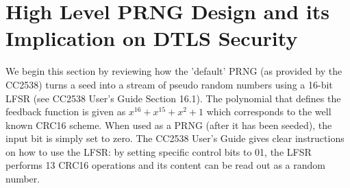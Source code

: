 \section{High Level PRNG Design and its Implication on DTLS Security} \label{LFSR}
We begin this section by reviewing how the 'default' PRNG (as provided by the CC2538) turns a seed into a stream of pseudo random numbers using a 16-bit LFSR (see CC2538 User's Guide\cite{CC2538Manual} Section 16.1). The polynomial that defines the feedback function is given as $x^{16} + x^{15} + x^{2} + 1$ which corresponds to the well known CRC16 scheme\cite{CRC}. When used as a PRNG (after it has been seeded), the input bit is simply set to zero. The CC2538 User's Guide\cite{CC2538Manual} gives clear instructions on how to use the LFSR: by setting specific control bits to 01, the LFSR performs 13 CRC16 operations and its content can be read out as a random number. 






